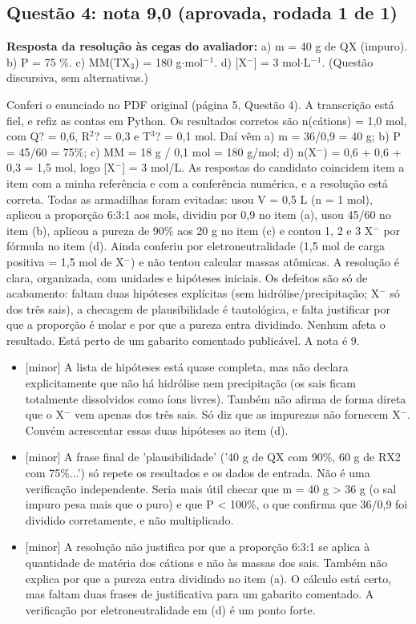 \documentclass{article}%
\begin{document}
\subsection*{Questão 4: nota 9,0 (aprovada, rodada 1 de 1)}%
\textbf{Resposta da resolução às cegas do avaliador:} a) m = 40 g de QX (impuro). b) P = 75 \%. c) MM(TX$_{3}$) = 180 g$\cdot$mol$^{-}$$^{1}$. d) {[}X$^{-}${]} = 3 mol$\cdot$L$^{-}$$^{1}$. (Questão discursiva, sem alternativas.)\par %
Conferi o enunciado no PDF original (página 5, Questão 4). A transcrição está fiel, e refiz as contas em Python. Os resultados corretos são n(cátions) = 1,0 mol, com Q? = 0,6, R$^2$? = 0,3 e T$^3$? = 0,1 mol. Daí vêm a) m = 36/0,9 = 40 g; b) P = 45/60 = 75\%; c) MM = 18 g / 0,1 mol = 180 g/mol; d) n(X$^{-}$) = 0,6 + 0,6 + 0,3 = 1,5 mol, logo {[}X$^{-}${]} = 3 mol/L. As respostas do candidato coincidem item a item com a minha referência e com a conferência numérica, e a resolução está correta. Todas as armadilhas foram evitadas: usou V = 0,5 L (n = 1 mol), aplicou a proporção 6:3:1 aos mols, dividiu por 0,9 no item (a), usou 45/60 no item (b), aplicou a pureza de 90\% aos 20 g no item (c) e contou 1, 2 e 3 X$^{-}$ por fórmula no item (d). Ainda conferiu por eletroneutralidade (1,5 mol de carga positiva = 1,5 mol de X$^{-}$) e não tentou calcular massas atômicas. A resolução é clara, organizada, com unidades e hipóteses iniciais. Os defeitos são só de acabamento: faltam duas hipóteses explícitas (sem hidrólise/precipitação; X$^{-}$ só dos três sais), a checagem de plausibilidade é tautológica, e falta justificar por que a proporção é molar e por que a pureza entra dividindo. Nenhum afeta o resultado. Está perto de um gabarito comentado publicável. A nota é 9.%
\begin{itemize}%
\item%
{[}minor{]} A lista de hipóteses está quase completa, mas não declara explicitamente que não há hidrólise nem precipitação (os sais ficam totalmente dissolvidos como íons livres). Também não afirma de forma direta que o X$^{-}$ vem apenas dos três sais. Só diz que as impurezas não fornecem X$^{-}$. Convém acrescentar essas duas hipóteses ao item (d).%
\item%
{[}minor{]} A frase final de 'plausibilidade' ('40 g de QX com 90\%, 60 g de RX2 com 75\%...') só repete os resultados e os dados de entrada. Não é uma verificação independente. Seria mais útil checar que m = 40 g > 36 g (o sal impuro pesa mais que o puro) e que P < 100\%, o que confirma que 36/0,9 foi dividido corretamente, e não multiplicado.%
\item%
{[}minor{]} A resolução não justifica por que a proporção 6:3:1 se aplica à quantidade de matéria dos cátions e não às massas dos sais. Também não explica por que a pureza entra dividindo no item (a). O cálculo está certo, mas faltam duas frases de justificativa para um gabarito comentado. A verificação por eletroneutralidade em (d) é um ponto forte.%
\end{itemize}%
\end{document}
